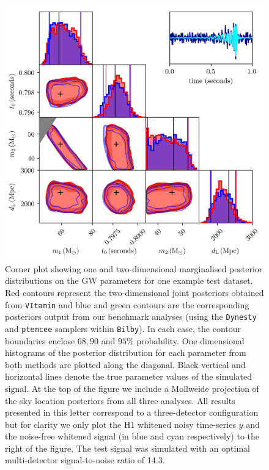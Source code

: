 %
%
\begin{figure}
    \includegraphics[width=\textwidth]{corner_testcase0.png}
    \caption{\label{fig:corner_plot} Corner plot showing one and two-dimensional
marginalised posterior distributions on the \ac{GW} parameters for one
example test dataset. Red contours represent the
two-dimensional joint posteriors obtained from \texttt{VItamin} and
blue and green contours are the corresponding posteriors
output from our benchmark analyses (using the \texttt{Dynesty} and \texttt{ptemcee}
samplers within \texttt{Bilby}). In each case, the contour boundaries enclose
$68,90$ and $95\%$ probability. One dimensional histograms of the posterior
distribution for each parameter from both methods are plotted along the
diagonal. Black vertical and horizontal lines denote the true parameter
values of the simulated signal. At the top of the figure we include a Mollweide
projection of the sky location posteriors from all three analyses. All results
presented in this letter correspond to a three-detector configuration but for
clarity we only plot the H1 whitened noisy time-series $y$ and the noise-free
whitened signal (in blue and cyan respectively) to the right of the figure. The
test signal was simulated with an optimal multi-detector signal-to-noise ratio of
14.3.} 
\end{figure}

